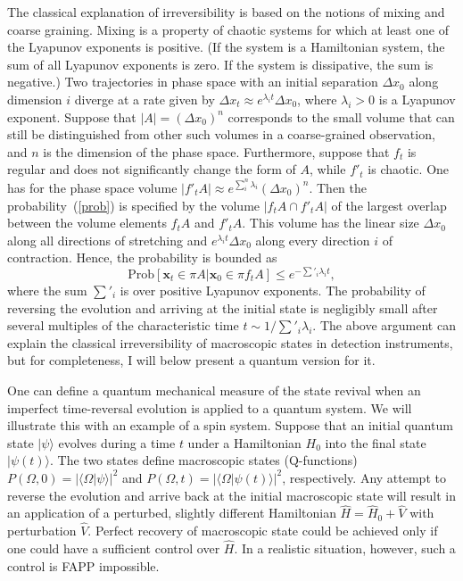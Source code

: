\documentclass[12pt,a4]{article}
\begin{document}
The classical explanation of irreversibility is based on the notions of mixing and coarse graining. Mixing is a property of chaotic systems for which at least one of the Lyapunov exponents is positive. (If the system is a Hamiltonian system, the sum of all Lyapunov exponents is zero. If the system is dissipative, the sum is negative.) Two trajectories in phase space with an initial separation $\Delta x_0$ along dimension $i$ diverge at a rate given by $ \Delta x_t  \approx e^{\lambda_i t}  \Delta x_0 $, where $\lambda_i>0$ is a Lyapunov exponent. Suppose that $|A|=(\Delta x_0)^n$ corresponds to the small volume that can still be distinguished from other such volumes in a coarse-grained observation, and $n$ is the dimension of the phase space. Furthermore, suppose that $f_t$ is regular and does not significantly change the form of $A$, while $f'_t$ is chaotic. One has for the phase space volume $|f'_t A| \approx e^{\sum_i^n \lambda_i} (\Delta x_0)^n$. Then the probability~(\ref{prob}) is specified by the volume $|f_t A \cap f'_t A|$ of the largest overlap between the volume elements $f_t A$ and $f'_t A$. This volume has the linear size $\Delta x_0$ along all directions of stretching  and $ e^{\lambda_i t} \Delta x_0$ along every direction $i$ of contraction. Hence, the probability is bounded as
\begin{equation}
\mbox{Prob}[\mathbf{x}_t \in \pi A| \mathbf{x}_0 \in \pi f_t A] \leq e^{-\sum'_{i} \lambda_it}, 
\end{equation}
where the sum $\sum'_i$ is over positive Lyapunov exponents. The probability of reversing the evolution and arriving at the initial state is negligibly small after several multiples of the characteristic time $t \sim 1/\sum'_i \lambda_i$. The above argument can explain the classical irreversibility of macroscopic states in detection instruments, but for completeness, I will below present a quantum version for it.

One can define a quantum mechanical measure of the state revival when an imperfect time-reversal evolution is applied to a quantum system. We will illustrate this with an example of a spin system. Suppose that an initial quantum state $|\psi\rangle$ evolves during a time $t$ under a Hamiltonian $H_0$ into the final state $|\psi(t)\rangle$. The two states define macroscopic states (Q-functions) $P(\Omega,0)=|\langle \Omega | \psi \rangle|^2$ and $P(\Omega,t)=|\langle \Omega | \psi(t) \rangle|^2$, respectively. Any attempt to reverse the evolution and arrive back at the initial macroscopic state will result in an application of a perturbed, slightly different Hamiltonian $\hat{H}=\hat{H}_0+\hat{V}$ with perturbation $\hat{V}$. Perfect recovery of macroscopic state could be achieved only if one could have a sufficient control over $\hat{H}$. In a realistic situation, however, such a control is FAPP impossible. 
\end{document}
